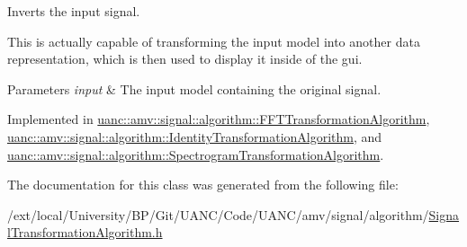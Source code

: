 Inverts the input signal. 

This is actually capable of transforming the input model into another data representation, which is then used to display it inside of the gui.


\begin{DoxyParams}{Parameters}
{\em input} & The input model containing the original signal. \\
\hline
\end{DoxyParams}


Implemented in \hyperlink{classuanc_1_1amv_1_1signal_1_1algorithm_1_1_f_f_t_transformation_algorithm_a0748e30e870a462a10220cb07c784f2a}{uanc\+::amv\+::signal\+::algorithm\+::\+F\+F\+T\+Transformation\+Algorithm}, \hyperlink{classuanc_1_1amv_1_1signal_1_1algorithm_1_1_identity_transformation_algorithm_aac5f7f10ab44d7f8625eb5dbb72e5c44}{uanc\+::amv\+::signal\+::algorithm\+::\+Identity\+Transformation\+Algorithm}, and \hyperlink{classuanc_1_1amv_1_1signal_1_1algorithm_1_1_spectrogram_transformation_algorithm_a988bc9d4cc15eafb384ed5c81885ef43}{uanc\+::amv\+::signal\+::algorithm\+::\+Spectrogram\+Transformation\+Algorithm}.



The documentation for this class was generated from the following file\+:\begin{DoxyCompactItemize}
\item 
/ext/local/\+University/\+B\+P/\+Git/\+U\+A\+N\+C/\+Code/\+U\+A\+N\+C/amv/signal/algorithm/\hyperlink{_signal_transformation_algorithm_8h}{Signal\+Transformation\+Algorithm.\+h}\end{DoxyCompactItemize}
